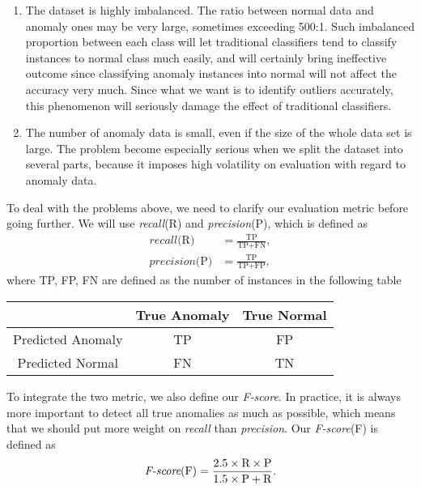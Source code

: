 \documentclass[english]{article}
\newenvironment{eqt}{\begin{equation}\begin{aligned}}{\end{aligned}\end{equation}}
\begin{document}
\begin{enumerate}
\item The dataset is highly imbalanced. The ratio between normal data and anomaly ones may be very large, sometimes exceeding 500:1. Such imbalanced proportion between each class will let traditional classifiers tend to classify instances to normal class much easily, and will certainly bring ineffective outcome since classifying anomaly instances into normal will not affect the accuracy very much. Since what we want is to identify outliers accurately, this phenomenon will seriously damage the effect of traditional classifiers.
\item The number of anomaly data is small, even if the size of the whole data set is large. The problem become especially serious when we split the dataset into several parts, because it imposes high volatility on evaluation with regard to anomaly data.
\end{enumerate} 
\par To deal with the problems above, we need to clarify our evaluation metric before going further. We will use \textit{recall}(R) and \textit{precision}(P), which is defined as
\begin{eqt}
\textit{recall}\text{(R)} & = \frac{\text{TP}}{\text{TP}+\text{FN}},\\ 
\textit{precision}\text{(P)} & = \frac{\text{TP}}{\text{TP}+\text{FP}},
\end{eqt}
where TP, FP, FN are defined as the number of instances in the following table
\begin{table}[h]
	\centering
	\begin{tabular}{|c|c|c|}
		\hline
			& True Anomaly & True Normal\\
		\hline
			Predicted Anomaly & TP & FP\\
		\hline
			Predicted Normal & FN & TN\\
		\hline
	\end{tabular}
\end{table}
\par To integrate the two metric, we also define our \textit{F-score}. In practice, it is always more important to detect all true anomalies as much as possible, which means that we should put more weight on \textit{recall} than \textit{precision}. Our \textit{F-score}(F) is defined as
\begin{eqt}
\textit{F-score}\text{(F)} = \frac{2.5\times \text R\times \text P}{1.5\times \text P + \text R}.
\end{eqt}
\end{document}
